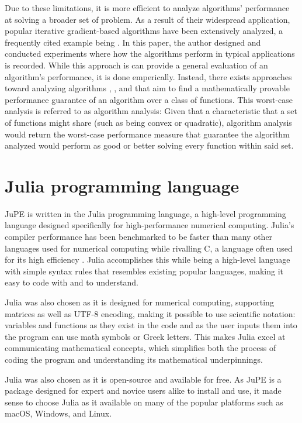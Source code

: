 Due to these limitations, it is more efficient to analyze algorithms' performance at solving a broader set of problem. As a result of their widespread application, popular iterative gradient-based algorithms have been extensively analyzed, a frequently cited example being \cite{adam}. In this paper, the author designed and conducted experiments where how the algorithms perform in typical applications is recorded. While this approach is can provide a general evaluation of an algorithm's performance, it is done emperically. Instead, there exists approaches toward analyzing algorithms \cite{drori2012}, \cite{taylor2016}, and \cite{lessard2016} that aim to find a mathematically provable performance guarantee of an algorithm over a class of functions. This worst-case analysis is referred to as algorithm analysis: Given that a characteristic that a set of functions might share (such as being convex or quadratic), algorithm analysis would return the worst-case performance measure that guarantee the algorithm analyzed would perform as good or better solving every function within said set.

\section{Julia programming language}

JuPE is written in the Julia programming language, a high-level programming language designed specifically for high-performance numerical computing. Julia's compiler performance has been benchmarked to be faster than many other languages used for numerical computing while rivalling C, a language often used for its high efficiency \cite{julia}. Julia accomplishes this while being a high-level language with simple syntax rules that resembles existing popular languages, making it easy to code with and to understand.

Julia was also chosen as it is designed for numerical computing, supporting matrices as well as UTF-8 encoding, making it possible to use scientific notation: variables and functions as they exist in the code and as the user inputs them into the program can use math symbols or Greek letters. This makes Julia excel at communicating mathematical concepts, which simplifies both the process of coding the program and understanding its mathematical underpinnings.

Julia was also chosen as it is open-source and available for free. As JuPE is a package designed for expert and novice users alike to install and use, it made sense to choose Julia as it available on many of the popular platforms such as macOS, Windows, and Linux.

